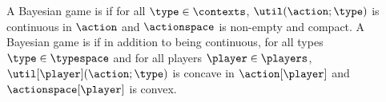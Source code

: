 

A Bayesian game is  if for all $\type \in \contexts$, $\util(\action; \type)$ is continuous in $\action$ and $\actionspace$ is non-empty and compact.
A Bayesian game is  if in addition to being continuous, for all types $\type \in \typespace$ and for all players $\player \in \players$, $\util[\player](\action; \type)$ is concave in $\action[\player]$ and $\actionspace[\player]$ is convex.

